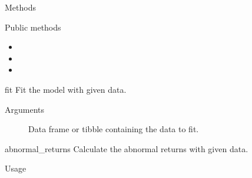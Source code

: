 \documentclass[a4paper]{book}
\begin{document}
\begin{Section}{Methods}
%
\begin{SubSection}{Public methods}
\begin{itemize}

\item{} 
\item{} 
\item{} 

\end{itemize}

\end{SubSection}



\hypertarget{method-MarketAdjustedModel-fit}{}
%
\begin{SubSection}{}
fit Fit the model with given data.
%

%
\begin{SubSubSection}{Arguments}

\begin{description}

\item[] Data frame or tibble containing the data to fit.

\end{description}



\end{SubSubSection}

\end{SubSection}




\hypertarget{method-MarketAdjustedModel-abnormal_returns}{}
%
\begin{SubSection}{}
abnormal\_returns Calculate the abnormal returns with given data.
%
\begin{SubSubSection}{Usage}


\end{SubSubSection}
\end{SubSection}
\end{Section}
\end{document}
